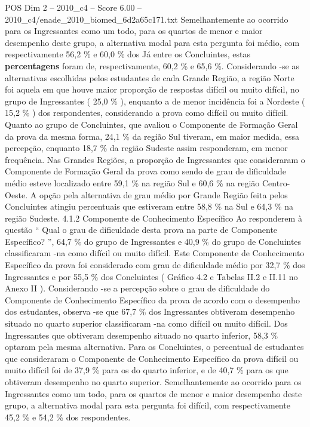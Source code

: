 \begin{textsample}{POS Dim 2 – 2010\_c4 – Score 6.00 – 2010\_c4/enade\_2010\_biomed\_6d2a65c171.txt}
Semelhantemente ao ocorrido para os Ingressantes como um todo, para os quartos de menor e maior desempenho deste grupo, a alternativa modal para esta pergunta foi médio, com respectivamente 56,2 \% e 60,0 \% dos Já entre os Concluintes, estas \textbf{percentagens} foram de, respectivamente, 60,2 \% e 65,6 \%.
Considerando -se as alternativas escolhidas pelos estudantes de cada Grande Região, a região Norte foi aquela em que houve maior proporção de respostas difícil ou muito difícil, no grupo de Ingressantes ( 25,0 \% ), enquanto a de menor incidência foi a Nordeste ( 15,2 \% ) dos respondentes, considerando a prova como difícil ou muito difícil.
Quanto ao grupo de Concluintes, que avaliou o Componente de Formação Geral da prova da mesma forma, 24,1 \% da região Sul tiveram, em maior medida, essa percepção, enquanto 18,7 \% da região Sudeste assim responderam, em menor frequência.
Nas Grandes Regiões, a proporção de Ingressantes que consideraram o Componente de Formação Geral da prova como sendo de grau de dificuldade médio esteve localizado entre 59,1 \% na região Sul e 60,6 \% na região Centro-Oeste.
A opção pela alternativa de grau médio por Grande Região feita pelos Concluintes atingiu percentuais que estiveram entre 58,8 \% na Sul e 64,3 \% na região Sudeste. 4.1.2 Componente de Conhecimento Específico Ao responderem à questão “ Qual o grau de dificuldade desta prova na parte de Componente Específico? ”, 64,7 \% do grupo de Ingressantes e 40,9 \% do grupo de Concluintes classificaram -na como difícil ou muito difícil.
Este Componente de Conhecimento Específico da prova foi considerado com grau de dificuldade médio por 32,7 \% dos Ingressantes e por 55,5 \% dos Concluintes ( Gráfico 4.2 e Tabelas II.2 e II.11 no Anexo II ).
Considerando -se a percepção sobre o grau de dificuldade do Componente de Conhecimento Específico da prova de acordo com o desempenho dos estudantes, observa -se que 67,7 \% dos Ingressantes obtiveram desempenho situado no quarto superior classificaram -na como difícil ou muito difícil.
Dos Ingressantes que obtiveram desempenho situado no quarto inferior, 58,3 \% optaram pela mesma alternativa.
Para os Concluintes, o percentual de estudantes que consideraram o Componente de Conhecimento Específico da prova difícil ou muito difícil foi de 37,9 \% para os do quarto inferior, e de 40,7 \% para os que obtiveram desempenho no quarto superior.
Semelhantemente ao ocorrido para os Ingressantes como um todo, para os quartos de menor e maior desempenho deste grupo, a alternativa modal para esta pergunta foi difícil, com respectivamente 45,2 \% e 54,2 \% dos respondentes.

\end{textsample}
